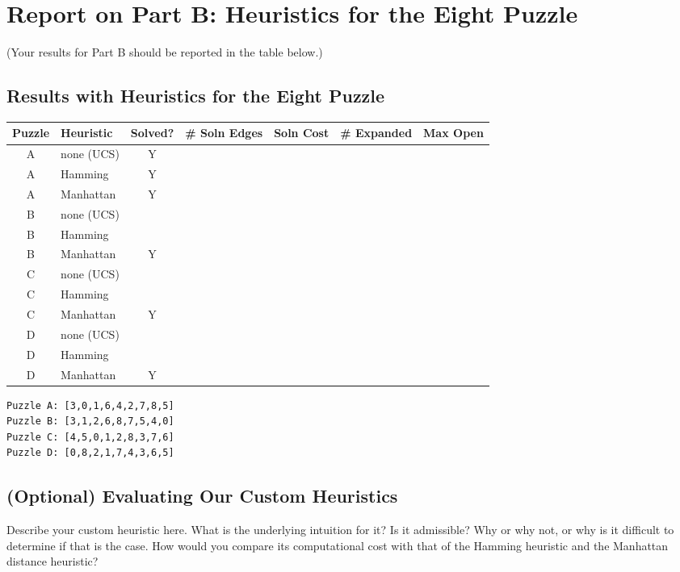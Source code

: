 \documentclass{article}
\begin{document}
\newpage
\section{Report on Part B: Heuristics for the Eight Puzzle}

(Your results for Part B should be reported in the table below.)


\subsection{Results with Heuristics for the Eight Puzzle}

{\flushleft
\begin{tabular}{|c|l|c|l|c|c|c|}
\hline
Puzzle & Heuristic & Solved? & \# Soln Edges & Soln Cost & \# Expanded & Max Open\\
\hline
A & none (UCS) & Y & & & & \\
\hline
A & Hamming & Y & & & & \\
\hline
A & Manhattan & Y & & & & \\
\hline
B & none (UCS) & & & & & \\
\hline
B & Hamming &  & & & & \\
\hline
B & Manhattan & Y & & & & \\
\hline
C & none (UCS) & & & & & \\
\hline
C & Hamming &  & & & & \\
\hline
C & Manhattan & Y & & & & \\
\hline
D & none (UCS) & & & & & \\
\hline
D & Hamming &  & & & & \\
\hline
D & Manhattan & Y & & & & \\
\hline

\end{tabular} }

\begin{verbatim}
Puzzle A: [3,0,1,6,4,2,7,8,5]
Puzzle B: [3,1,2,6,8,7,5,4,0]
Puzzle C: [4,5,0,1,2,8,3,7,6]
Puzzle D: [0,8,2,1,7,4,3,6,5]
\end{verbatim}

\subsection{(Optional) Evaluating Our Custom Heuristics}

Describe your custom heuristic here.  What is the underlying intuition for it?
Is it admissible? Why or why not, or why is it difficult to determine if that
is the case.  How would you compare its computational cost with that of
the Hamming heuristic and the Manhattan distance heuristic?
\end{document}
